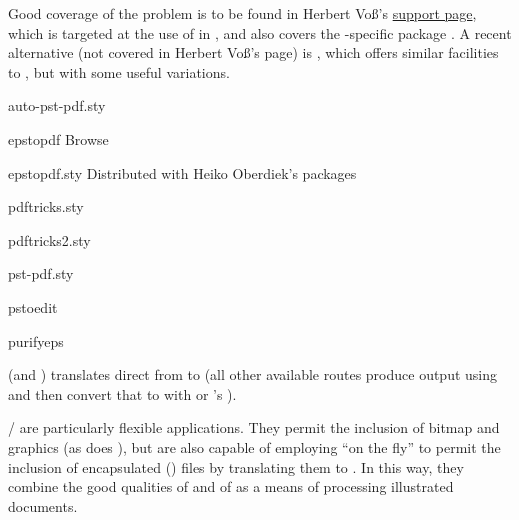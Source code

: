 Good coverage of the problem is to be found in Herbert Vo\ss {}'s
\href{http://pstricks.tug.org/main.cgi?file=pdf/pdfoutput}{ support page},
which is targeted at the use of  in
\PDFLaTeX{}, and also covers the -specific package
.  A recent alternative (not covered in %
Herbert Vo\ss {}'s page) is , which offers similar
facilities to , but with some useful variations.
\begin{ctanrefs}
\item[auto-pst-pdf.sty]
\item[epstopdf]Browse 
\item[epstopdf.sty]Distributed with Heiko Oberdiek's packages
\item[pdftricks.sty]
\item[pdftricks2.sty]
\item[pst-pdf.sty]
\item[pstoedit]
\item[purifyeps]
\end{ctanrefs}


 (and ) translates direct from
 to  (all other available routes produce \PS{}
output using  and then convert that to  with
\href{http://www.ghostscript.com/}{}
or 's ).

/ are particularly flexible
applications.  They permit the inclusion of bitmap and 
graphics (as does ), but are also
capable of employing
\href{http://www.ghostscript.com/}{} ``on the
fly'' to permit the inclusion of encapsulated \PS{} ()
files by translating them to .  In this way, they combine the good
qualities of  and of \PDFTeX{} as a means of
processing illustrated documents.

